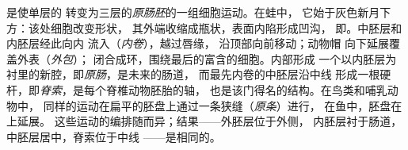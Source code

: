 \begin{proposition}[原肠作用]\label{prop:b2:vertebrate-development:gastrulation}
\emph{}是使单层的
转变为三层的\emph{原肠胚}的一组细胞运动。在蛙中，
它始于灰色新月下方：该处细胞改变形状，
其外端收缩成瓶状，表面内陷形成凹沟，
即\emph{}。中胚层和内胚层经此向内
流入（\emph{内卷}），越过唇缘，
沿顶部向前移动；动物帽
向下延展覆盖外表（\emph{外包}）；
闭合成环，围绕最后的富含的细胞。内部形成
一个以内胚层为衬里的新腔，即\emph{原肠}，是未来的肠道，
而最先内卷的中胚层沿中线
形成一根硬杆，即\emph{脊索}，是每个脊椎动物胚胎的轴，
也是该门得名的结构。在鸟类和哺乳动物中，
同样的运动在扁平的胚盘上通过一条狭缝（\emph{原条}）进行，
在鱼中，胚盘在上延展。
这些运动的编排随而异；结果——外胚层位于外侧，
内胚层衬于肠道，中胚层居中，脊索位于中线
——是相同的。
\end{proposition}

